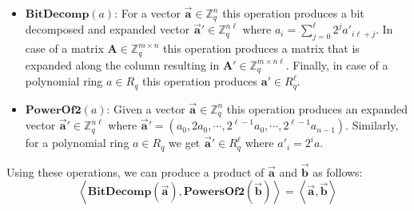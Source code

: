 \begin{itemize}
\item{$\mathbf{BitDecomp}\left(a\right)$}: For a vector $\vec{\mathbf{a}} \in \mathbb{Z}_q^n$ this operation produces a bit decomposed and expanded vector $\vec{\mathbf{a}}' \in \mathbb{Z}_q^{n\ell}$ where $a_i = \sum^{\ell}_{j=0}2^j a'_{i\ell + j}$. In case of a matrix $\mathbf{A} \in \mathbb{Z}_q^{m\times n}$ this operation produces a matrix that is expanded along the column resulting in $\mathbf{A}' \in \mathbb{Z}_q^{m\times n\ell}$. Finally, in case of a polynomial ring $a \in R_q$ this operation produces $\mathbf{a}' \in R_q^\ell$.  
\item{$\mathbf{PowerOf2}\left(a\right)$}: Given a vector $\vec{\mathbf{a}} \in \mathbb{Z}_q^n$ this operation produces an expanded vector $\vec{\mathbf{a}}' \in \mathbb{Z}_q^{n\ell}$ where $\vec{\mathbf{a}}' = \left(a_0,2a_0,\cdots,2^{\ell-1}a_0,\cdots, 2^{\ell-1}a_{n-1}\right)$. Similarly, for a polynomial ring $a \in R_q$ we get $\vec{\mathbf{a}}' \in R_q^{\ell}$ where $a'_i = 2^ia$.
\end{itemize}
Using these operations, we can produce a product of $\vec{\mathbf{a}}$ and $\vec{\mathbf{b}}$ as follows: $$\left\langle \mathbf{BitDecomp}\left( \vec{\mathbf{a}} \right), \mathbf{PowersOf2}\left( \vec{\mathbf{b}}\right)\right\rangle = \left\langle \vec{\mathbf{a}},\vec{\mathbf{b}}\right\rangle$$ 
